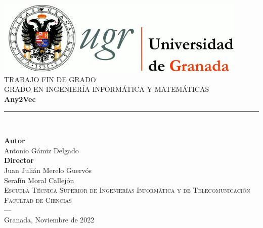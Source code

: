 \begin{titlepage}
\newlength{\centeroffset}
\setlength{\centeroffset}{-0.5\oddsidemargin}
\addtolength{\centeroffset}{0.5\evensidemargin}
\thispagestyle{empty}

\noindent\hspace*{\centeroffset}\begin{minipage}{\textwidth}

\centering
\includegraphics[width=0.9\textwidth]{logos/logo_ugr.jpg}\\[1.4cm]

\textsc{ \Large TRABAJO FIN DE GRADO\\[0.2cm]}
\textsc{ GRADO EN INGENIERÍA INFORMÁTICA Y MATEMÁTICAS}\\[1cm]

{\Huge\bfseries Any2Vec \\}
\noindent\rule[-1ex]{\textwidth}{3pt}\\[3.5ex]
{\large\bfseries }
\end{minipage}

\vspace{2.5cm}
\noindent\hspace*{\centeroffset}
\begin{minipage}{\textwidth}
\centering

\textbf{Autor}\\ {Antonio Gámiz Delgado}\\[2.5ex]
\textbf{Director}\\ {Juan Julián Merelo Guervós \\ Serafín Moral Callejón }\\[2cm]
\textsc{Escuela Técnica Superior de Ingenierías Informática y de Telecomunicación}\\
\textsc{Facultad de Ciencias}\\
\textsc{---}\\
Granada, Noviembre de 2022
\end{minipage}
\end{titlepage}
